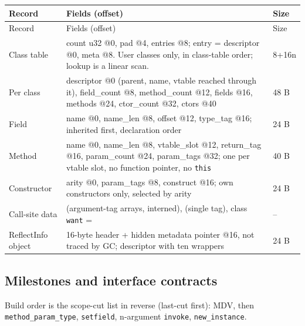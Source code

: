 \documentclass[10pt]{article}
\newcommand{\code}[1]{\texttt{\small #1}}
\begin{document}
\begin{xltabular}{\linewidth}{@{}L{3.3cm}Y L{1.1cm}@{}}
\toprule
Record & Fields (offset) & Size \\
\midrule
\endfirsthead
\toprule Record & Fields (offset) & Size \\ \midrule
\endhead
Class table  & count u32 @0, pad @4, entries @8; entry = descriptor @0, meta @8. User classes only, in class-table order; lookup is a linear scan. & 8+16n \\
Per class  & descriptor @0 (parent, name, vtable reached through it), field\_count @8, method\_count @12, fields @16, methods @24, ctor\_count @32, ctors @40 & 48 B \\
Field  & name @0, name\_len @8, offset @12, type\_tag @16; inherited first, declaration order & 24 B \\
Method  & name @0, name\_len @8, vtable\_slot @12, return\_tag @16, param\_count @24, param\_tags @32; one per vtable slot, no function pointer, no \code{this} & 40 B \\
Constructor  & arity @0, param\_tags @8, construct @16; own constructors only, selected by arity & 24 B \\
Call-site data &  (argument-tag arrays, interned),  (single tag), class \code{want} =  & -- \\
ReflectInfo object & 16-byte header + hidden metadata pointer @16, not traced by GC; descriptor  with ten wrappers & 24 B \\
\bottomrule
\end{xltabular}

\subsection{Milestones and interface contracts}\label{sec:lo5-milestones}
Build order is the scope-cut list in reverse (last-cut first): MDV, then \code{method\_param\_type}, \code{setfield}, n-argument \code{invoke}, \code{new\_instance}.
\end{document}
